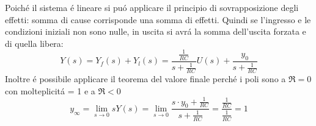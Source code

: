 \documentclass[../main.tex]{subfiles}
\begin{document}
\begin{mdframed}[style=Esempio]
			Poich\'{e} il sistema \'{e} lineare si pu\'{o} applicare il principio di sovrapposizione degli effetti: somma di cause corrisponde una somma di effetti. Quindi se l'ingresso e le condizioni iniziali non sono nulle, in uscita si avr\'{a} la somma dell'uscita forzata e di quella libera:
			\[
				Y(s) = Y_f(s) + Y_l(s) = \frac{\frac{1}{RC}}{s+\frac{1}{RC}}U(s) + \frac{y_0}{s+\frac{1}{RC}}
			\]
			Inoltre \'{e} possibile applicare il teorema del valore finale perch\'{e} i poli sono a $ \Re = 0 $ con molteplicit\'a = 1 e a $ \Re < 0 $
			\[
				y_\infty = \lim\limits_{s \rightarrow 0} sY(s) = \lim\limits_{s \rightarrow 0} \frac{s \cdot y_0+\frac{1}{RC}}{s+\frac{1}{RC}} = \frac{\frac{1}{RC}}{\frac{1}{RC}} = 1 
			\]
		\end{mdframed}
\end{document}
